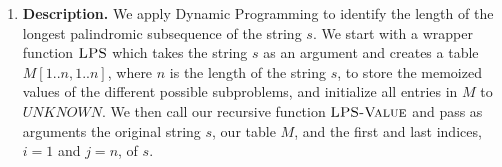 \documentclass[11pt]{article}
\theoremstyle{nonumberplain}
\begin{document}
\begin{enumerate}
\item \textbf{Description.} %
  We apply Dynamic Programming to identify the length of the longest palindromic subsequence of the string $s$. We start with a wrapper function $\textnormal{\scshape LPS}$ which takes the string $s$ as an argument and creates a table $M[1..n,1..n]$, where $n$ is the length of the string $s$, to store the memoized values of the different possible subproblems, and initialize all entries in $M$ to $UNKNOWN$. We then call our recursive function $\textnormal{\scshape LPS-Value}$ and pass as arguments the original string $s$, our table $M$, and the first and last indices, $i=1$ and $j=n$, of $s$. \\
  \\

\end{enumerate}
\end{document}
